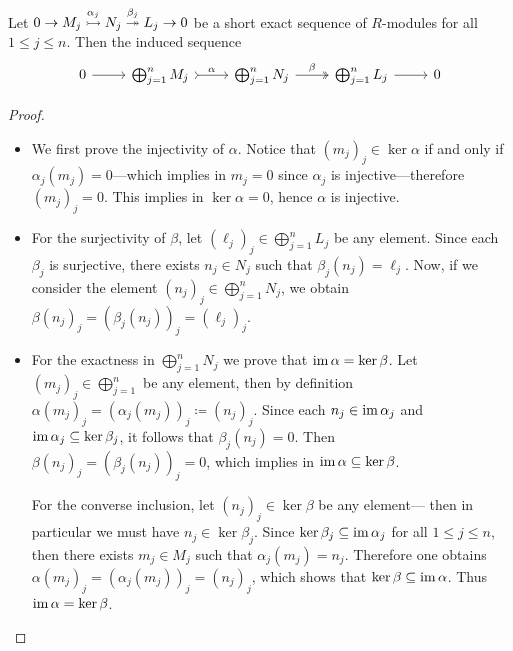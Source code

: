\begin{proposition}
\label{prop:induced-short-exact-sequence-direct-sum}
Let \(0 \to M_j \overset{\alpha_j}{\rightarrowtail} N_j \overset{\beta_j}{\twoheadrightarrow} L_j \to 0\) be
a short exact sequence of \(R\)-modules for all \(1 \leq j \leq n\). Then the
induced sequence
\[
\begin{tikzcd}
0 \ar[r] &\bigoplus_{j=1}^n M_j
\ar[r, tail, "\alpha"]
&\bigoplus_{j=1}^n N_j
\ar[r, two heads, "\beta"]
&\bigoplus_{j=1}^n L_j
\ar[r]
&0
\end{tikzcd}
\]
\end{proposition}

\begin{proof}
\begin{itemize}\setlength\itemsep{0em}
\item We first prove the injectivity of \(\alpha\). Notice that \((m_j)_j
  \in \ker \alpha\) if and only if \(\alpha_j(m_j) = 0\)---which implies in
  \(m_j = 0\) since \(\alpha_j\) is injective---therefore \((m_j)_j =
  0\). This implies in \(\ker \alpha = 0\), hence \(\alpha\) is injective.

\item For the surjectivity of \(\beta\), let
  \((\ell_j)_j \in \bigoplus_{j=1}^n L_j\) be any element. Since each
  \(\beta_j\) is surjective, there exists \(n_j \in N_j\) such that
  \(\beta_j(n_j) = \ell_j\). Now, if we consider the element
  \((n_j)_j \in \bigoplus_{j=1}^n N_j\), we obtain
  \(\beta(n_j)_j = (\beta_j(n_j))_j = (\ell_j)_j\).

\item For the exactness in \(\bigoplus_{j=1}^n N_j\) we prove that \(\operatorname{im} \alpha
  = \ker \beta\). Let \((m_j)_j \in \bigoplus_{j=1}^n\) be any element,
  then by definition \(\alpha(m_j)_j = (\alpha_j(m_j))_j \coloneq
  (n_j)_j\). Since each \(n_j \in \operatorname{im} \alpha_j\) and \(\operatorname{im} \alpha_j
  \subseteq \ker \beta_j\), it follows that \(\beta_j(n_j) = 0\). Then
  \(\beta(n_j)_j = (\beta_j(n_j))_j = 0\), which implies in \(\operatorname{im} \alpha
  \subseteq \ker \beta\).

  For the converse inclusion, let \((n_j)_j \in \ker \beta\) be any element---
  then in particular we must have \(n_j \in \ker \beta_j\). Since \(\ker \beta_j
  \subseteq \operatorname{im} \alpha_j\) for all \(1 \leq j \leq n\), then there exists \(m_j
  \in M_j\) such that \(\alpha_j(m_j) = n_j\). Therefore one obtains
  \(\alpha(m_j)_j = (\alpha_j(m_j))_j = (n_j)_j\), which shows that \(\ker \beta
  \subseteq \operatorname{im} \alpha\). Thus \(\operatorname{im} \alpha = \ker \beta\).
\end{itemize}
\end{proof}

